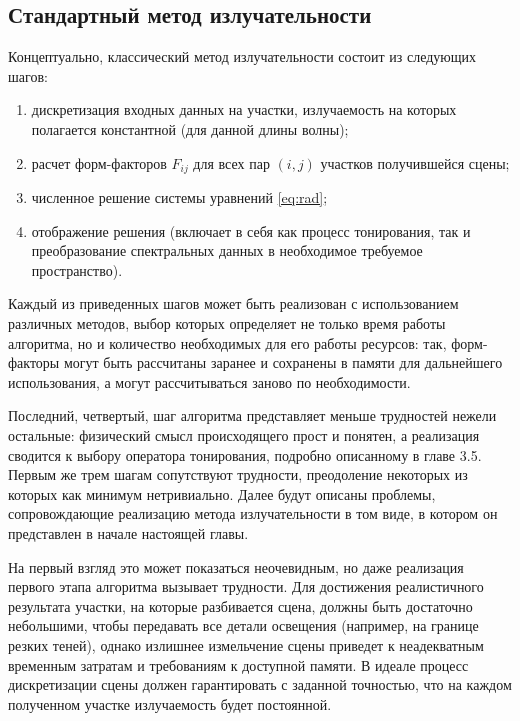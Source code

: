 \documentclass[12pt]{article}
\begin{document}
\subsection{Стандартный метод излучательности}
Концептуально, классический метод излучательности состоит из следующих шагов:
\begin{enumerate}
\item дискретизация входных данных на участки, излучаемость на которых полагается константной (для данной длины волны);
\item расчет форм-факторов $F_{ij}$ для всех пар $(i, j)$ участков получившейся сцены;
\item численное решение системы уравнений \eqref{eq:rad};
\item отображение решения (включает в себя как процесс тонирования, так и преобразование спектральных данных в необходимое требуемое пространство).
\end{enumerate}

Каждый из приведенных шагов может быть реализован с использованием различных методов, выбор которых определяет не только время работы алгоритма, но и количество необходимых для его работы ресурсов: так, форм-факторы могут быть рассчитаны заранее и сохранены в памяти для дальнейшего использования, а могут рассчитываться заново по необходимости.

Последний, четвертый, шаг алгоритма представляет меньше трудностей нежели остальные: физический смысл происходящего прост и понятен, а реализация сводится к выбору оператора тонирования, подробно описанному в главе 3.5. Первым же трем шагам сопутствуют трудности, преодоление некоторых из которых как минимум нетривиально. Далее будут описаны проблемы, сопровождающие реализацию метода излучательности в том виде, в котором он представлен в начале настоящей главы.

На первый взгляд это может показаться неочевидным, но даже реализация первого этапа алгоритма вызывает трудности. Для достижения реалистичного результата участки, на которые разбивается сцена, должны быть достаточно небольшими, чтобы передавать все детали освещения (например, на границе резких теней), однако излишнее измельчение сцены приведет к неадекватным временным затратам и требованиям к доступной памяти. В идеале процесс дискретизации сцены должен гарантировать с заданной точностью, что на каждом полученном участке излучаемость будет постоянной.
\end{document}
